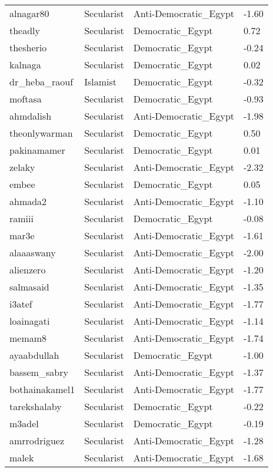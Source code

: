 \begin{longtable}{llll}
  alnagar80 & Secularist & Anti-Democratic\_Egypt & -1.60 \\ 
  theadly & Secularist & Democratic\_Egypt & 0.72 \\ 
  thesherio & Secularist & Democratic\_Egypt & -0.24 \\ 
  kalnaga & Secularist & Democratic\_Egypt & 0.02 \\ 
  dr\_heba\_raouf & Islamist & Democratic\_Egypt & -0.32 \\ 
  moftasa & Secularist & Democratic\_Egypt & -0.93 \\ 
  ahmdalish & Secularist & Anti-Democratic\_Egypt & -1.98 \\ 
  theonlywarman & Secularist & Democratic\_Egypt & 0.50 \\ 
  pakinamamer & Secularist & Democratic\_Egypt & 0.01 \\ 
  zelaky & Secularist & Anti-Democratic\_Egypt & -2.32 \\ 
  embee & Secularist & Democratic\_Egypt & 0.05 \\ 
  ahmada2 & Secularist & Anti-Democratic\_Egypt & -1.10 \\ 
  ramiii & Secularist & Democratic\_Egypt & -0.08 \\ 
  mar3e & Secularist & Anti-Democratic\_Egypt & -1.61 \\ 
  alaaaswany & Secularist & Anti-Democratic\_Egypt & -2.00 \\ 
  alienzero & Secularist & Anti-Democratic\_Egypt & -1.20 \\ 
  salmasaid & Secularist & Anti-Democratic\_Egypt & -1.35 \\ 
  i3atef & Secularist & Anti-Democratic\_Egypt & -1.77 \\ 
  loainagati & Secularist & Anti-Democratic\_Egypt & -1.14 \\ 
  memam8 & Secularist & Anti-Democratic\_Egypt & -1.74 \\ 
  ayaabdullah & Secularist & Democratic\_Egypt & -1.00 \\ 
  bassem\_sabry & Secularist & Anti-Democratic\_Egypt & -1.37 \\ 
  bothainakamel1 & Secularist & Anti-Democratic\_Egypt & -1.77 \\ 
  tarekshalaby & Secularist & Democratic\_Egypt & -0.22 \\ 
  m3adel & Secularist & Democratic\_Egypt & -0.19 \\ 
  amrrodriguez & Secularist & Anti-Democratic\_Egypt & -1.28 \\ 
  malek & Secularist & Anti-Democratic\_Egypt & -1.68 \\ 

\end{longtable}
